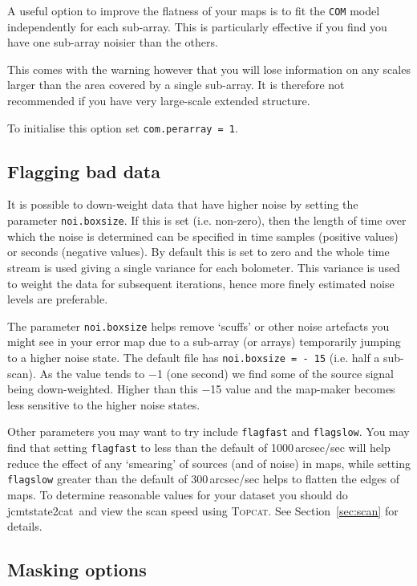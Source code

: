 \documentclass[twoside,11pt]{article}
\newcommand{\htmladdnormallink}[2]{#1}
\newcommand{\htmlref}[2]{#1}
\newcommand{\latexhtml}[2]{#1}
\newcommand{\xref}[3]{#1}
\newcommand{\xlabel}[1]{}
\renewcommand{\_}{\texttt{\symbol{95}}}
\newcommand{\topcat}{\htmladdnormallink{\textsc{Topcat}}{http://www.starlink.ac.uk/topcat}}
\newcommand{\task}[1]{\textsf{#1}}
\newcommand{\param}[1]{\texttt{#1}}
\newcommand{\model}[1]{\texttt{#1}}
\newcommand{\jcmtstate}{\xref{\task{jcmtstate2cat}}{sun258}{JCMTSTATE2CAT}}
\newcommand{\cref}[3]{\latexhtml{#1~\ref{#2}}{\htmlref{#3}{#2}}}
\begin{document}
A useful option to improve the flatness of your maps is to fit the
\model{COM} model independently for each sub-array. This is
particularly effective if you find you have one sub-array noisier than
the others.

This comes with the warning however that you will lose information on
any scales larger than the area covered by a single sub-array. It is
therefore not recommended if you have very large-scale extended
structure.

To initialise this option set \param{com.perarray~=~1}.


\subsection{\xlabel{noibox}Flagging bad data}
\label{sec:noibox}

It is possible to down-weight data that have higher noise by setting
the parameter \param{noi.box\_size}. If this is set (i.e. non-zero),
then the length of time over which the noise is determined can be
specified in time samples (positive values) or seconds (negative
values). By default this is set to zero and the whole time stream is
used giving a single variance for each bolometer. This variance is
used to weight the data for subsequent iterations, hence more finely
estimated noise levels are preferable.

The parameter \param{noi.box\_size} helps remove `scuffs' or other
noise artefacts you might see in your error map due to a sub-array (or
arrays) temporarily jumping to a higher noise state. The default file
has \param{noi.box\_size = - 15} (i.e. half a sub-scan). As the
value tends to $-$1 (one second) we find some of the source signal being
down-weighted. Higher than this $-$15 value and the map-maker becomes
less sensitive to the higher noise states.

Other parameters you may want to try include \param{flagfast} and
\param{flagslow}. You may find that setting \param{flagfast} to less
than the default of 1000\,arcsec/sec will help reduce the effect of any
`smearing' of sources (and of noise) in maps, while setting
\param{flagslow} greater than the default of 300\,arcsec/sec helps to
flatten the edges of maps. To determine reasonable values for your
 dataset you should do \jcmtstate\ and view the scan speed using
\topcat. See \cref{Section}{sec:scan}{Displaying scan patterns} for
details.


\subsection{\xlabel{mask}Masking options}
\label{sec:mask}
\end{document}
